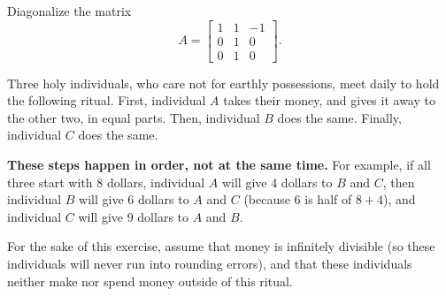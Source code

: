 \documentclass[addpoints]{exam}
\begin{document}
\begin{questions}

\question[20] Diagonalize the matrix
\[A =
\begin{bmatrix}
1 & 1 & -1 \\
0 & 1 & 0 \\
0 & 1 & 0
\end{bmatrix}.\]

\question Three holy individuals, who care not for earthly possessions, meet daily to hold the following ritual. First, individual $A$ takes their money, and gives it away to the other two, in equal parts. Then, individual $B$ does the same. Finally, individual $C$ does the same.

\textbf{These steps happen in order, not at the same time.} For example, if all three start with 8 dollars, individual $A$ will give 4 dollars to $B$ and $C$, then individual $B$ will give 6 dollars to $A$ and $C$ (because 6 is half of $8+4$), and individual $C$ will give 9 dollars to $A$ and $B$.

For the sake of this exercise, assume that money is infinitely divisible (so these individuals will never run into rounding errors), and that these individuals neither make nor spend money outside of this ritual.

\end{questions}
\end{document}
